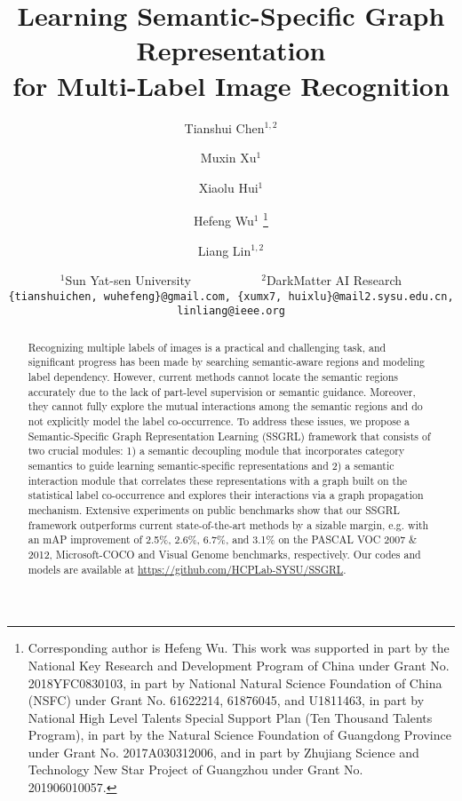 \documentclass[10pt,twocolumn,letterpaper]{article}
\begin{document}
\title{Learning Semantic-Specific Graph Representation \\ for Multi-Label Image Recognition}
 \author{Tianshui Chen$^{1,2}$ \and Muxin Xu$^{1}$ \and Xiaolu Hui$^{1}$ \and Hefeng Wu$^{1}$ \thanks{Corresponding author is Hefeng Wu. This work was supported in part by the National Key Research and Development Program of China under Grant No. 2018YFC0830103, in part by National Natural Science Foundation of China (NSFC) under Grant No. 61622214, 61876045, and U1811463, in part by National High Level Talents Special Support Plan (Ten Thousand Talents Program), in part by the Natural Science Foundation of Guangdong Province under Grant No. 2017A030312006, and in part by Zhujiang Science and Technology New Star Project of Guangzhou under Grant No. 201906010057.} \and Liang Lin$^{1,2}$\vspace{1ex}\\
 \and $^1$Sun Yat-sen University ~~~~~~~~~~ $^2$DarkMatter AI Research \\
 {\tt\small \{tianshuichen, wuhefeng\}@gmail.com, \{xumx7, huixlu\}@mail2.sysu.edu.cn, linliang@ieee.org}
}

\maketitle
\ificcvfinal\thispagestyle{empty}\fi

\begin{abstract}
Recognizing multiple labels of images is a practical and challenging task, and significant progress has been made by searching semantic-aware regions and modeling label dependency. However, current methods cannot locate the semantic regions accurately due to the lack of part-level supervision or semantic guidance. Moreover, they cannot fully explore the mutual interactions among the semantic regions and do not explicitly model the label co-occurrence. To address these issues, we propose a Semantic-Specific Graph Representation Learning (SSGRL) framework that consists of two crucial modules: 1) a semantic decoupling module that incorporates category semantics to guide learning semantic-specific representations and 2) a semantic interaction module that correlates these representations with a graph built on the statistical label co-occurrence and explores their interactions via a graph propagation mechanism. Extensive experiments on public benchmarks show that our SSGRL framework outperforms current state-of-the-art methods by a sizable margin, e.g. with an mAP improvement of 2.5\%, 2.6\%, 6.7\%, and 3.1\% on the PASCAL VOC 2007 \& 2012, Microsoft-COCO and Visual Genome benchmarks, respectively. Our codes and models are available at \url{https://github.com/HCPLab-SYSU/SSGRL}.
\end{abstract}
\end{document}
